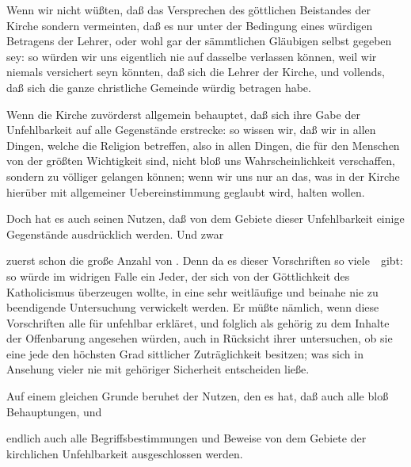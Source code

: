 Wenn wir nicht wüßten, daß das Versprechen des göttlichen Beistandes der Kirche  sondern vermeinten, daß es nur unter der Bedingung eines würdigen Betragens der Lehrer, oder wohl gar der sämmtlichen Gläubigen selbst gegeben sey: so würden wir uns eigentlich nie auf dasselbe verlassen können, weil wir niemals versichert seyn könnten, daß sich die Lehrer der Kirche, und vollends, daß sich die ganze christliche Gemeinde würdig betragen habe.

\begin{aufza}
\item Wenn die Kirche zuvörderst allgemein behauptet, daß sich ihre Gabe der Unfehlbarkeit auf alle  Gegenstände erstrecke: so wissen wir, daß wir in allen Dingen, welche die Religion betreffen, also in allen Dingen, die für den Menschen von der größten Wichtigkeit sind, nicht bloß uns Wahrscheinlichkeit verschaffen, sondern zu völliger  gelangen können; wenn wir uns nur an das, was in der Kirche hierüber mit allgemeiner Uebereinstimmung geglaubt wird, halten wollen.
\item Doch hat es auch seinen Nutzen, daß von dem Gebiete dieser Unfehlbarkeit einige Gegenstände ausdrücklich  werden. Und zwar
\begin{aufzb}
\item zuerst schon die große Anzahl von . Denn da es dieser Vorschriften so viele~\ gibt: so würde im widrigen Falle ein Jeder, der sich von der Göttlichkeit des Katholicismus überzeugen wollte, in eine sehr weitläufige und beinahe nie zu beendigende Untersuchung verwickelt werden. Er müßte nämlich, wenn diese Vorschriften alle für unfehlbar erkläret, und folglich als gehörig zu dem Inhalte der Offenbarung angesehen würden, auch in Rücksicht ihrer untersuchen, ob sie eine jede den höchsten Grad sittlicher Zuträglichkeit besitzen; was sich in Ansehung vieler nie mit gehöriger Sicherheit entscheiden ließe.
\item Auf einem gleichen Grunde beruhet der Nutzen, den es hat, daß auch alle bloß  Behauptungen, und
\item endlich auch alle  Begriffsbestimmungen und Beweise von dem Gebiete der kirchlichen Unfehlbarkeit ausgeschlossen werden.
\end{aufzb}

\end{aufza}
